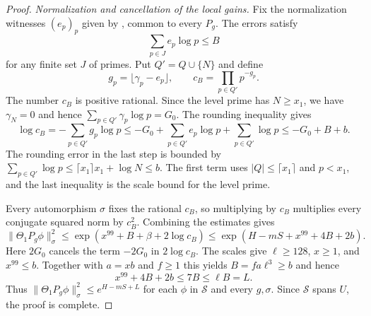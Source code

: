 \begin{proof}
\emph{Normalization and cancellation of the local gains.}
Fix the normalization witnesses $(e_p)_p$ given by , common to every $P_g$. The errors satisfy
\[
 \sum_{p\in J}e_p\log p\le B
\]
for any finite set $J$ of primes. Put $Q'=Q\cup\{N\}$ and define
\[
 g_p=\lfloor\gamma_p-e_p\rfloor,\qquad c_B=\prod_{p\in Q'}p^{-g_p}.
\]
The number $c_B$ is positive rational. Since the level prime has $N\ge x_1$, we have $\gamma_N=0$ and hence $\sum_{p\in Q'}\gamma_p\log p=G_0$. The rounding inequality gives
\[
 \log c_B
 =-\sum_{p\in Q'}g_p\log p
 \le -G_0 +\sum_{p\in Q'}e_p\log p+\sum_{p\in Q'}\log p
 \le -G_0+B+b .
\]
The rounding error in the last step is bounded by
$\sum_{p\in Q'}\log p\le\lceil x_1\rceil x_1+\log N\le b$. The first term uses $|Q|\le\lceil x_1\rceil$ and $p<x_1$, and the last inequality is the scale bound for the level prime.

Every automorphism $\sigma$ fixes the rational $c_B$, so multiplying by $c_B$ multiplies every conjugate squared norm by $c_B^2$. Combining the estimates gives
\[
 \|\Theta_1P_g\phi\|_\sigma^2
 \le \exp(x^{99}+B+\beta+2\log c_B)
 \le \exp(H-mS+x^{99}+4B+2b).
\]
Here $2G_0$ cancels the term $-2G_0$ in $2\log c_B$. The scales give $\ell\ge128$, $x\ge1$, and $x^{99}\le b$. Together with $a=xb$ and $f\ge1$ this yields $B=fa\ell^3\ge b$ and hence
\[
 x^{99}+4B+2b\le7B\le\ell B=L .
\]
Thus $\|\Theta_1P_g\phi\|_\sigma^2\le e^{H-mS+L}$ for each $\phi$ in $\mathcal S$ and every $g,\sigma$. Since $\mathcal S$ spans $U$, the proof is complete.
\end{proof}

